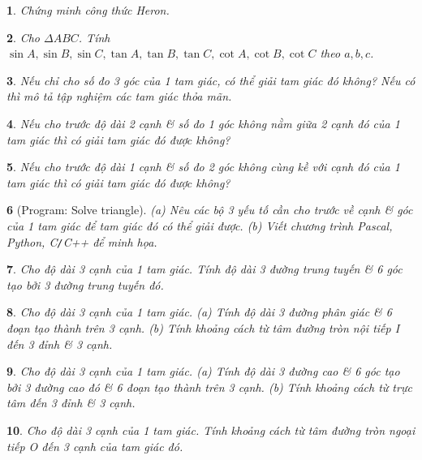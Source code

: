 \documentclass{article}
\newtheorem{baitoan}{}
\begin{document}
\begin{baitoan}
	Chứng minh công thức Heron.
\end{baitoan}

\begin{baitoan}
	Cho $\Delta ABC$. Tính $\sin A,\sin B,\sin C,\tan A,\tan B,\tan C,\cot A,\cot B,\cot C$ theo $a,b,c$.
\end{baitoan}

\begin{baitoan}
	Nếu chỉ cho số đo 3 góc của 1 tam giác, có thể giải tam giác đó không? Nếu có thì mô tả tập nghiệm các tam giác thỏa mãn.
\end{baitoan}

\begin{baitoan}
	Nếu cho trước độ dài 2 cạnh \& số đo 1 góc không nằm giữa 2 cạnh đó của 1 tam giác thì có giải tam giác đó được không?
\end{baitoan}

\begin{baitoan}
	Nếu cho trước độ dài 1 cạnh \& số đo 2 góc không cùng kề với cạnh đó của 1 tam giác thì có giải tam giác đó được không?
\end{baitoan}

\begin{baitoan}[{\sf Program: Solve triangle}]
	(a) Nêu các bộ 3 yếu tố cần cho trước về cạnh \& góc của 1 tam giác để tam giác đó có thể giải được. (b) Viết chương trình {\sf Pascal, Python, C{\tt/}C++} để minh họa.
\end{baitoan}

\begin{baitoan}
	Cho độ dài 3 cạnh của 1 tam giác. Tính độ dài 3 đường trung tuyến \& 6 góc tạo bởi 3 đường trung tuyến đó.
\end{baitoan}

\begin{baitoan}
	Cho độ dài 3 cạnh của 1 tam giác. (a) Tính độ dài 3 đường phân giác \& 6 đoạn tạo thành trên 3 cạnh. (b) Tính khoảng cách từ tâm đường tròn nội tiếp I đến 3 đỉnh \& 3 cạnh.
\end{baitoan}

\begin{baitoan}
	Cho độ dài 3 cạnh của 1 tam giác. (a) Tính độ dài 3 đường cao \& 6 góc tạo bởi 3 đường cao đó \& 6 đoạn tạo thành trên 3 cạnh. (b) Tính khoảng cách từ trực tâm đến 3 đỉnh \& 3 cạnh.
\end{baitoan}

\begin{baitoan}
	Cho độ dài 3 cạnh của 1 tam giác. Tính khoảng cách từ tâm đường tròn ngoại tiếp O đến 3 cạnh của tam giác đó.
\end{baitoan}
\end{document}
